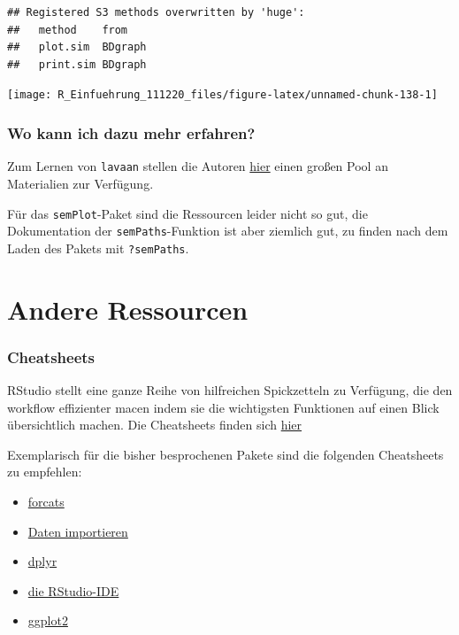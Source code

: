 \documentclass[
]{book}
\begin{document}
\begin{verbatim}
## Registered S3 methods overwritten by 'huge':
##   method    from   
##   plot.sim  BDgraph
##   print.sim BDgraph
\end{verbatim}

\begin{center}\texttt{[image: R\_Einfuehrung\_111220\_files/figure-latex/unnamed-chunk-138-1]} \end{center}

\hypertarget{wo-kann-ich-dazu-mehr-erfahren-4}{%
\subsubsection{Wo kann ich dazu mehr erfahren?}\label{wo-kann-ich-dazu-mehr-erfahren-4}}

Zum Lernen von \texttt{lavaan} stellen die Autoren \href{https://lavaan.ugent.be/resources/teaching.html}{hier} einen großen Pool an Materialien zur Verfügung.

Für das \texttt{semPlot}-Paket sind die Ressourcen leider nicht so gut, die Dokumentation der \texttt{semPaths}-Funktion ist aber ziemlich gut, zu finden nach dem Laden des Pakets mit \texttt{?semPaths}.

\hypertarget{andere-ressourcen}{%
\section{Andere Ressourcen}\label{andere-ressourcen}}

\hypertarget{cheatsheets}{%
\subsubsection{Cheatsheets}\label{cheatsheets}}

RStudio stellt eine ganze Reihe von hilfreichen Spickzetteln zu Verfügung, die den workflow effizienter macen indem sie die wichtigsten Funktionen auf einen Blick übersichtlich machen. Die Cheatsheets finden sich \href{https://rstudio.com/resources/cheatsheets/}{hier}

Exemplarisch für die bisher besprochenen Pakete sind die folgenden Cheatsheets zu empfehlen:

\begin{itemize}
\item
  \href{https://github.com/rstudio/cheatsheets/raw/master/factors.pdf}{forcats}
\item
  \href{https://github.com/rstudio/cheatsheets/raw/master/data-import.pdf}{Daten importieren}
\item
  \href{https://github.com/rstudio/cheatsheets/raw/master/data-transformation.pdf}{dplyr}
\item
  \href{https://github.com/rstudio/cheatsheets/raw/master/rstudio-ide.pdf}{die RStudio-IDE}
\item
  \href{https://github.com/rstudio/cheatsheets/raw/master/data-visualization-2.1.pdf}{ggplot2}
\end{itemize}
\end{document}
